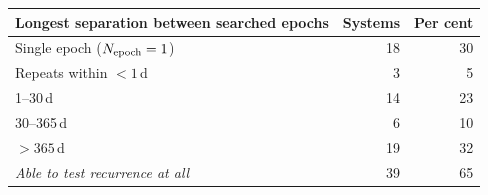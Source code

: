 \begin{tabular}{@{}lrr@{}}
\toprule
Longest separation between searched epochs & Systems & Per cent \\
\midrule
Single epoch ($N_{\rm epoch}=1$) & 18 & 30 \\
Repeats within $<1$\,d & 3 & 5 \\
1--30\,d & 14 & 23 \\
30--365\,d & 6 & 10 \\
$>365$\,d & 19 & 32 \\
\midrule
\emph{Able to test recurrence at all} & 39 & 65 \\
\bottomrule
\end{tabular}
